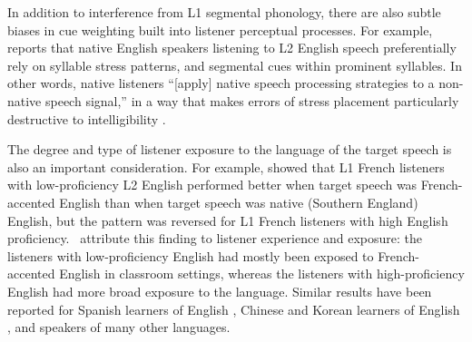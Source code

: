 In addition to interference from L1 segmental phonology, there are also subtle biases in cue weighting built into listener perceptual processes.  For example, \citeauthor{Zielinski2008} reports that native English speakers listening to L2 English speech preferentially rely on syllable stress patterns, and segmental cues within prominent syllables.  In other words, native listeners “[apply] native speech processing strategies to a non-native speech signal,” in a way that makes errors of stress placement particularly destructive to intelligibility \citep[80]{Zielinski2008}.

The degree and type of listener exposure to the language of the target speech is also an important consideration.  For example, \citet{PinetEtAl2011} showed that L1 French listeners with low-proficiency L2 English performed better when target speech was French-accented English than when target speech was native (Southern England) English, but the pattern was reversed for L1 French listeners with high English proficiency.  \citeauthor{PinetEtAl2011}\ attribute this finding to listener experience and exposure: the listeners with low-proficiency English had mostly been exposed to French-accented English in classroom settings, whereas the listeners with high-proficiency English had more broad exposure to the language.  Similar results have been reported for Spanish learners of English \citep{ImaiEtAl2005}, Chinese and Korean learners of English \citep{BentBradlow2003}, and speakers of many other languages.%

